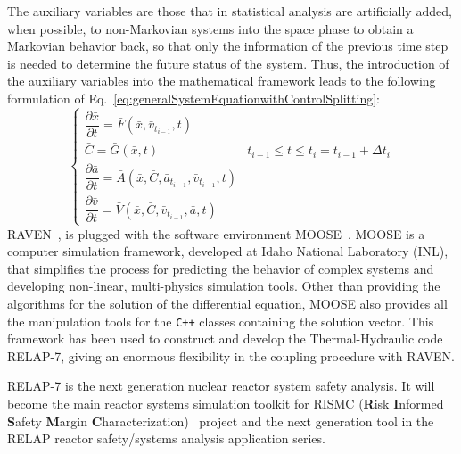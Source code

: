 \documentclass{mc2013}
\begin{document}
The auxiliary variables are those that in statistical analysis are artificially added, when possible, to non-Markovian systems into the space phase to obtain a Markovian behavior back, so that only the information of the previous time step is needed to determine the future status of the system.
Thus, the introduction of the auxiliary variables into the mathematical framework leads to the following formulation of Eq.~\ref{eq:generalSystemEquationwithControlSplitting}:
\vspace{-2mm}
\begin{equation}
\begin{cases} 
\dfrac{\partial \bar{x}}{\partial t} = \bar{F}(\bar{x},\bar{v}_{t_{i-1}},t) \\
\bar{C} = \bar{G}(\bar{x},t) & t_{i-1}\leq t\leq t_{i} = t_{i-1} + \Delta t_{i}\\ 
\dfrac{\partial \bar{a}}{\partial t} = \bar{A}(\bar{x},\bar{C},\bar{a}_{t_{i-1}},\bar{v}_{t_{i-1}},t) \\
\dfrac{\partial \bar{v}}{\partial t} = \bar{V}(\bar{x},\bar{C},\bar{v}_{t_{i-1}},\bar{a},t) 
\end{cases}
\label{eq:generalSystemEquationwithControlSplittingAndAux}
\end{equation}
RAVEN~\cite{alfonsiMC}, is plugged with the software environment MOOSE~\cite{MOOSE}. MOOSE is a computer simulation framework,  developed at Idaho National Laboratory (INL), that simplifies the process for predicting the behavior of complex systems and developing non-linear, multi-physics simulation tools. Other than providing the algorithms for the solution of the differential equation, MOOSE also provides all the manipulation tools for the \verb!C++! classes containing the solution vector. This framework has been used to construct and develop the Thermal-Hydraulic code RELAP-7, giving an enormous flexibility in the coupling procedure with RAVEN.

RELAP-7 is the next generation nuclear reactor system safety analysis. It will become the main reactor systems simulation toolkit for RISMC (\textbf{R}isk \textbf{I}nformed \textbf{S}afety \textbf{M}argin \textbf{C}haracterization)~\cite{mandelliANS_RISMC} project and the next generation tool in the RELAP reactor safety/systems analysis application series. 
\end{document}
